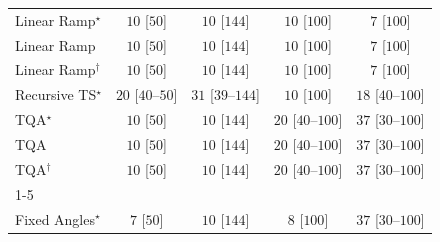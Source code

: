 \begin{tabular}{l|cccc|}
Linear Ramp$^\star$ & {\cellcolor[HTML]{F7FCF5}} \color[HTML]{000000} $10$ [$50$] & {\cellcolor[HTML]{F7FCF5}} \color[HTML]{000000} $10$ [$144$] & {\cellcolor[HTML]{F7FCF5}} \color[HTML]{000000} $10$ [$100$] & {\cellcolor[HTML]{F7FCF5}} \color[HTML]{000000} $7$ [$100$] \\
Linear Ramp & {\cellcolor[HTML]{F7FCF5}} \color[HTML]{000000} $10$ [$50$] & {\cellcolor[HTML]{F7FCF5}} \color[HTML]{000000} $10$ [$144$] & {\cellcolor[HTML]{F7FCF5}} \color[HTML]{000000} $10$ [$100$] & {\cellcolor[HTML]{F7FCF5}} \color[HTML]{000000} $7$ [$100$] \\
Linear Ramp$^\dagger$ & {\cellcolor[HTML]{F7FCF5}} \color[HTML]{000000} $10$ [$50$] & {\cellcolor[HTML]{F7FCF5}} \color[HTML]{000000} $10$ [$144$] & {\cellcolor[HTML]{F7FCF5}} \color[HTML]{000000} $10$ [$100$] & {\cellcolor[HTML]{F7FCF5}} \color[HTML]{000000} $7$ [$100$] \\
Recursive TS$^\star$ & {\cellcolor[HTML]{F5FBF2}} \color[HTML]{000000} $20$ [$40$--$50$] & {\cellcolor[HTML]{F3FAF0}} \color[HTML]{000000} $31$ [$39$--$144$] & {\cellcolor[HTML]{F7FCF5}} \color[HTML]{000000} $10$ [$100$] & {\cellcolor[HTML]{F5FBF3}} \color[HTML]{000000} $18$ [$40$--$100$] \\
TQA$^\star$ & {\cellcolor[HTML]{F7FCF5}} \color[HTML]{000000} $10$ [$50$] & {\cellcolor[HTML]{F7FCF5}} \color[HTML]{000000} $10$ [$144$] & {\cellcolor[HTML]{F5FBF2}} \color[HTML]{000000} $20$ [$40$--$100$] & {\cellcolor[HTML]{F2FAEF}} \color[HTML]{000000} $37$ [$30$--$100$] \\
TQA & {\cellcolor[HTML]{F7FCF5}} \color[HTML]{000000} $10$ [$50$] & {\cellcolor[HTML]{F7FCF5}} \color[HTML]{000000} $10$ [$144$] & {\cellcolor[HTML]{F5FBF2}} \color[HTML]{000000} $20$ [$40$--$100$] & {\cellcolor[HTML]{F2FAEF}} \color[HTML]{000000} $37$ [$30$--$100$] \\
TQA$^\dagger$ & {\cellcolor[HTML]{F7FCF5}} \color[HTML]{000000} $10$ [$50$] & {\cellcolor[HTML]{F7FCF5}} \color[HTML]{000000} $10$ [$144$] & {\cellcolor[HTML]{F5FBF2}} \color[HTML]{000000} $20$ [$40$--$100$] & {\cellcolor[HTML]{F2FAEF}} \color[HTML]{000000} $37$ [$30$--$100$] \\
\cline{1-5}
\multicolumn{5}{c}{\rule{0pt}{8pt}PP} \\
\midrule
Fixed Angles$^\star$ & {\cellcolor[HTML]{F7FCF5}} \color[HTML]{000000} $7$ [$50$] & {\cellcolor[HTML]{F7FCF5}} \color[HTML]{000000} $10$ [$144$] & {\cellcolor[HTML]{F7FCF5}} \color[HTML]{000000} $8$ [$100$] & {\cellcolor[HTML]{F2FAEF}} \color[HTML]{000000} $37$ [$30$--$100$] \\

\end{tabular}
